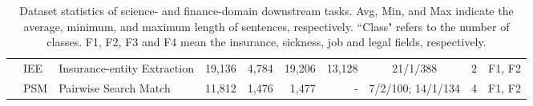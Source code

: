\documentclass[11pt]{article}
\begin{document}
\begin{table*}[t]
{\begin{tabular}{c|l|l|r|r|r|r|c|r|l}
   & IEE      & Insurance-entity Extraction           & 19,136  &   4,784  &   19,206  &  13,128 & 21/1/388  &   2 
  & F1, F2  \\  
& \multirow{1}{*}{PSM}     & \multirow{1}{*}{Pairwise Search Match}
                             & \multirow{1}{*}{11,812}     &  \multirow{1}{*}{1,476}  & \multirow{1}{*}{1,477}
                             &  \multirow{1}{*}{-} & 7/2/100; 14/1/134  
                             & \multirow{1}{*}{4} 
                             & \multirow{1}{*}{F1, F2}       \\ 
                            \hline
    \end{tabular}
    }
    \caption{Dataset statistics of science- and finance-domain downstream tasks. Avg, Min, and Max indicate the average, minimum, and maximum length of sentences, respectively. ``Class"  refers to the number of classes. 
    F1, F2, F3 and F4 mean the insurance, sickness, job and legal fields, respectively.
    }
    \label{tab:datasets_sci_fi}
\end{table*}
\end{document}
